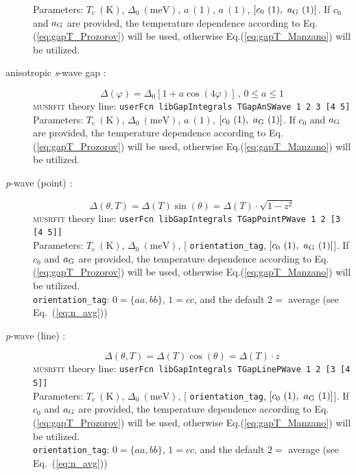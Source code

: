 \documentclass[twoside]{article}
\newcommand{\musrfit}{\textsc{musrfit}\xspace}
\begin{document}
\begin{description}
    Parameters: $T_{\mathrm c}~(\mathrm{K})$, $\Delta_0~(\mathrm{meV})$, $a~(1)$, $a~(1)$, $[c_0~(1),~a_{\rm G}~(1)]$. 
    If $c_0$ and $a_{\rm G}$ are provided, the temperature dependence according to Eq.(\ref{eq:gapT_Prozorov}) will be used, 
    otherwise Eq.(\ref{eq:gapT_Manzano}) will be utilized.
 \item[anisotropic \textit{s}-wave gap \cite{AnisotropicSWave}:] 
    \begin{equation}
      \Delta(\varphi) = \Delta_0\left[1+a\cos\left(4\varphi\right)\right]\,,\,0\leqslant a\leqslant1
    \end{equation}
    \musrfit theory line: \verb?userFcn libGapIntegrals TGapAnSWave 1 2 3 [4 5]?\\[1.5ex]
    Parameters: $T_{\mathrm c}~(\mathrm{K})$, $\Delta_0~(\mathrm{meV})$, $a~(1)$, $[c_0~(1),~a_{\rm G}~(1)]$. 
    If $c_0$ and $a_{\rm G}$ are provided, the temperature dependence according to Eq.(\ref{eq:gapT_Prozorov}) will be used, 
    otherwise Eq.(\ref{eq:gapT_Manzano}) will be utilized.
\item[\textit{p}-wave (point) \cite{Pang2015}:]
   \begin{equation}
     \Delta(\theta, T) = \Delta(T) \sin(\theta) = \Delta(T) \cdot \sqrt{1-z^2}
   \end{equation}
   \musrfit theory line: \verb?userFcn libGapIntegrals TGapPointPWave 1 2 [3 [4 5]]?\\[1.5ex]
    Parameters: $T_{\mathrm c}~(\mathrm{K})$, $\Delta_0~(\mathrm{meV})$, [ \verb?orientation_tag?, $[c_0~(1),~a_{\rm G}~(1)]$]. If $c_0$ and $a_{\rm G}$ are provided, 
    the temperature dependence according to Eq.(\ref{eq:gapT_Prozorov}) will be used, otherwise Eq.(\ref{eq:gapT_Manzano}) will be utilized. \\
    \verb?orientation_tag?: $0=\{aa,bb\}$, $1=cc$, and the default $2=$ average (see Eq.\ (\ref{eq:n_avg}))
\item[\textit{p}-wave (line) \cite{Ozaki1986}:]
   \begin{equation}
     \Delta(\theta, T) = \Delta(T) \cos(\theta) = \Delta(T) \cdot z
   \end{equation}
   \musrfit theory line: \verb?userFcn libGapIntegrals TGapLinePWave 1 2 [3 [4 5]]?\\[1.5ex]
    Parameters: $T_{\mathrm c}~(\mathrm{K})$, $\Delta_0~(\mathrm{meV})$, [ \verb?orientation_tag?, $[c_0~(1),~a_{\rm G}~(1)]$]. If $c_0$ and $a_{\rm G}$ are provided, 
    the temperature dependence according to Eq.(\ref{eq:gapT_Prozorov}) will be used, otherwise Eq.(\ref{eq:gapT_Manzano}) will be utilized. \\
    \verb?orientation_tag?: $0=\{aa,bb\}$, $1=cc$, and the default $2=$ average (see Eq.\ (\ref{eq:n_avg}))
\end{description}
\end{document}
